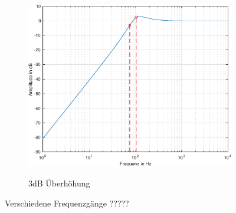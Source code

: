 \begin{figure}[bth]
    \vspace{0.5cm}
    \begin{subfigure}{.5\textwidth}
        \centering
        \caption{3dB Überhöhung}
        \includegraphics[width=0.85\linewidth]{Figures/Frequenzgang_3dB.eps}
        \label{Frequenzgang_3dB}
    \end{subfigure}

    \caption{Verschiedene Frequenzgänge ?????}
\end{figure}